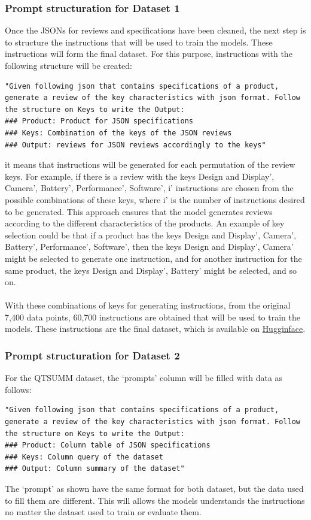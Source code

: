 \subsubsection{Prompt structuration for Dataset 1}
Once the JSONs for reviews and specifications have been cleaned, the next step is to structure the instructions that will be used to train the models. These instructions will form the final dataset. For this purpose, instructions with the following structure will be created:
\begin{lstlisting}[style=textstyle, frame = single, caption=Prompt structuration, label=code:prompt-structuration]
"Given following json that contains specifications of a product, generate a review of the key characteristics with json format. Follow the structure on Keys to write the Output: 
### Product: Product for JSON specifications
### Keys: Combination of the keys of the JSON reviews
### Output: reviews for JSON reviews accordingly to the keys"
\end{lstlisting}
it means that instructions will be generated for each permutation of the review keys. For example, if there is a review with the keys Design and Display', Camera', Battery', Performance', Software', i' instructions are chosen from the possible combinations of these keys, where i' is the number of instructions desired to be generated. This approach ensures that the model generates reviews according to the different characteristics of the products. An example of key selection could be that if a product has the keys Design and Display', Camera', Battery', Performance', Software', then the keys Design and Display', Camera' might be selected to generate one instruction, and for another instruction for the same product, the keys Design and Display', Battery' might be selected, and so on.
\\\\
With these combinations of keys for generating instructions, from the original 7,400 data points, 60,700 instructions are obtained that will be used to train the models. These instructions are the final dataset, which is available on \href{https://huggingface.co/datasets/kokujin/json_data_luis}{Hugginface}.

\subsubsection{Prompt structuration for Dataset 2}
For the QTSUMM dataset, the `prompts' column will be filled with data as follows:
\newpage
\begin{lstlisting}[style=textstyle, frame = single, caption=Prompt structuration, label=code:prompt-structuration]
"Given following json that contains specifications of a product, generate a review of the key characteristics with json format. Follow the structure on Keys to write the Output: 
### Product: Column table of JSON specifications
### Keys: Column query of the dataset
### Output: Column summary of the dataset"
\end{lstlisting}
The `prompt' as shown have the same format for both dataset, but the data used to fill them are different. This will allows the models understands the instructions no matter the dataset used to train or evaluate them.


